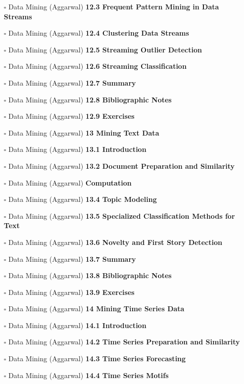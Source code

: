 \documentclass[a4, landscape, 12pt]{article}
\newcommand{\checkbox}{$\square$}%
\begin{document}
\begin{itemize}
{}
\item [\checkbox]  Data Mining (Aggarwal) \textbf{ 12.3 Frequent Pattern Mining in Data Streams
}
\item [\checkbox]  Data Mining (Aggarwal) \textbf{ 12.4 Clustering Data Streams
}
\item [\checkbox]  Data Mining (Aggarwal) \textbf{ 12.5 Streaming Outlier Detection
}
\item [\checkbox]  Data Mining (Aggarwal) \textbf{ 12.6 Streaming Classification
}
\item [\checkbox]  Data Mining (Aggarwal) \textbf{ 12.7 Summary
}
\item [\checkbox]  Data Mining (Aggarwal) \textbf{ 12.8 Bibliographic Notes
}
\item [\checkbox]  Data Mining (Aggarwal) \textbf{ 12.9 Exercises
}
\item [\checkbox]  Data Mining (Aggarwal) \textbf{ 13 Mining Text Data
}
\item [\checkbox]  Data Mining (Aggarwal) \textbf{ 13.1 Introduction
}
\item [\checkbox]  Data Mining (Aggarwal) \textbf{ 13.2 Document Preparation and Similarity
}
\item [\checkbox]  Data Mining (Aggarwal) \textbf{ Computation
}
\item [\checkbox]  Data Mining (Aggarwal) \textbf{ 13.4 Topic Modeling
}
\item [\checkbox]  Data Mining (Aggarwal) \textbf{ 13.5 Specialized Classification Methods for Text
}
\item [\checkbox]  Data Mining (Aggarwal) \textbf{ 13.6 Novelty and First Story Detection
}
\item [\checkbox]  Data Mining (Aggarwal) \textbf{ 13.7 Summary
}
\item [\checkbox]  Data Mining (Aggarwal) \textbf{ 13.8 Bibliographic Notes
}
\item [\checkbox]  Data Mining (Aggarwal) \textbf{ 13.9 Exercises
}
\item [\checkbox]  Data Mining (Aggarwal) \textbf{ 14 Mining Time Series Data
}
\item [\checkbox]  Data Mining (Aggarwal) \textbf{ 14.1 Introduction
}
\item [\checkbox]  Data Mining (Aggarwal) \textbf{ 14.2 Time Series Preparation and Similarity
}
\item [\checkbox]  Data Mining (Aggarwal) \textbf{ 14.3 Time Series Forecasting
}
\item [\checkbox]  Data Mining (Aggarwal) \textbf{ 14.4 Time Series Motifs
}
\end{itemize}
\end{document}
